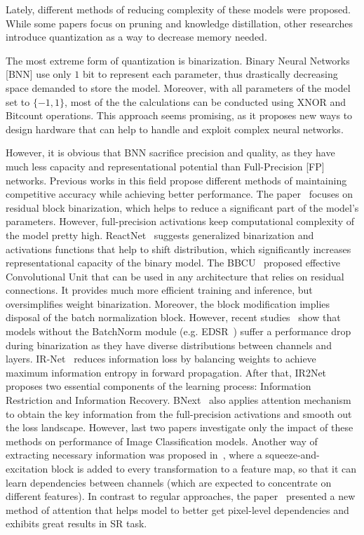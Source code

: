 \documentclass{article}
\begin{document}
Lately, different methods of reducing complexity of these models were proposed. While some papers focus on pruning and knowledge distillation, other researches introduce quantization as a way to decrease memory needed.

The most extreme form of quantization is binarization. Binary Neural Networks [BNN] use only $1$ bit to represent each parameter, thus drastically decreasing space demanded to store the model. Moreover, with all parameters of the model set to $\{-1, 1\}$, most of the the calculations can be conducted using XNOR and Bitcount operations. This approach seems promising, as it proposes new ways to design hardware that can help to handle and exploit complex neural networks.

However, it is obvious that BNN sacrifice precision and quality, as they have much less capacity and representational potential than Full-Precision [FP] networks. Previous works in this field propose different methods of maintaining competitive accuracy while achieving better performance. The paper~\cite{ma2019efficient} focuses on residual block binarization, which helps to reduce a significant part of the model's parameters. However, full-precision activations keep computational complexity of the model pretty high. ReactNet~\cite{liu2020reactnet} suggests generalized binarization and activations functions that help to shift distribution, which significantly increases representational capacity of the binary model. The BBCU~\cite{xia2022basic} proposed effective Convolutional Unit that can be used in any architecture that relies on residual connections. It provides much more efficient training and inference, but oversimplifies weight binarization. Moreover, the block modification implies disposal of the batch normalization block. However, recent studies~\cite{wei2023ebsr} show that models without the BatchNorm module (e.g. EDSR~\cite{lim2017enhanced}) suffer a performance drop during binarization as they have diverse distributions between channels and layers. 
IR-Net~\cite{qin2020forward} reduces information loss by balancing weights to achieve maximum information entropy in forward propagation. After that, IR2Net~\cite{xue2022ir2net} proposes two essential components of the learning process: Information Restriction and Information Recovery. BNext~\cite{guo2022join} also applies attention mechanism to obtain the key information from the full-precision activations and smooth out the loss landscape. 
However, last two papers investigate only the impact of these methods on performance of Image Classification models. Another way of extracting necessary information was proposed in~\cite{hu2018squeeze}, where a squeeze-and-excitation block is added to every transformation to a feature map, so that it can learn dependencies between channels (which are expected to concentrate on different features). 
In contrast to regular approaches, the paper~\cite{zhao2020efficient} presented a new method of attention that helps model to better get pixel-level dependencies and exhibits great results in SR task. 
\end{document}
